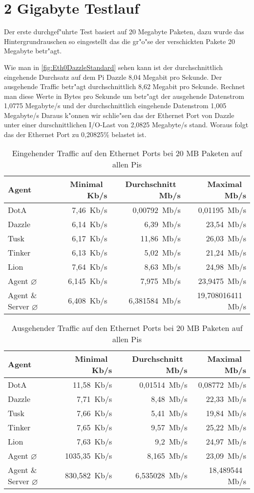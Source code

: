 \section{2 Gigabyte Testlauf}
\label{subsec:2GBTest}
Der erste durchgef"uhrte Test basiert auf 20 Megabyte Paketen, dazu wurde das Hintergrundrauschen %
so eingestellt das die gr"o"se der verschickten Pakete 20 Megabyte betr"agt. 

Wie man in \cref{fig:Eth0DazzleStandard} sehen kann ist der durchschnittlich eingehende Durchsatz auf dem Pi Dazzle 8,04 Megabit %
pro Sekunde. Der ausgehende Traffic betr"agt durchschnittlich 8,62 Megabit pro Sekunde. Rechnet man diese Werte in Bytes pro Sekunde um %
betr"agt der ausgehende Datenstrom 1,0775 Megabyte/s und der durchschnittlich eingehende Datenstrom 1,005 Megabyte/s %
Daraus k"onnen wir schlie"sen das der Ethernet Port von Dazzle unter einer durschnittlichen I/O-Last von 2,0825 Megabyte/s stand. %
Woraus folgt das der Ethernet Port zu 0,20825\% belastet ist.
\begin{table}
\centering
\begin{tabular}{l%
 r<{\,Kb/s}%
 r<{\,Mb/s}%
 r<{\,Mb/s}%
}
Agent  				& Minimal		& Durchschnitt		& Maximal	\\
\hline
DotA				& 7,46			& 0,00792		& 0,01195	\\		
Dazzle 				& 6,14			& 6,39			& 23,54		\\
Tusk 				& 6,17			& 11,86			& 26,03		\\
Tinker				& 6,13			& 5,02			& 21,24		\\
Lion				& 7,64			& 8,63			& 24,98		\\ 
Agent $\diameter $	 	& 6,145			& 7,975			& 23,9475	\\   
Agent \& Server $\diameter$   	& 6,408			& 6,381584		& 19,708016411	\\ 

\end{tabular}
\caption{Eingehender Traffic auf den Ethernet Ports bei 20 MB Paketen auf allen Pis}
\label{tab:EingehenderTraffic2GB}
\end{table}

\begin{table}
\centering
\begin{tabular}{l%
 r<{\,Kb/s}%
 r<{\,Mb/s}%
 r<{\,Mb/s}%
}
Agent  				& Minimal		& Durchschnitt		& Maximal	\\	
\hline
DotA				& 11,58			& 0,01514		& 0,08772	\\
Dazzle 				& 7,71			& 8,48	 		& 22,33		\\
Tusk 				& 7,66			& 5,41			& 19,84		\\
Tinker				& 7,65			& 9,57			& 25,22		\\
Lion				& 7,63			& 9,2			& 24,97		\\ 
Agent $\diameter $	 	& 1035,35		& 8,165			& 23,09		\\   
Agent \& Server $\diameter$   	& 830,582		& 6,535028		& 18,489544	\\ 

\end{tabular}
\caption{Ausgehender Traffic auf den Ethernet Ports bei 20 MB Paketen auf allen Pis}
\label{tab:AusgehenderTraffic2GB}
\end{table}


